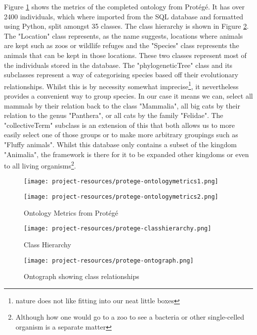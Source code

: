 \documentclass[a4paper]{article}
\begin{document}
Figure \ref{fig:ontologymetrics} shows the metrics of the completed ontology from Protégé. It has over 2400 individuals, which where imported from the SQL database and formatted using Python, split amongst 35 classes. 
The class hierarchy is shown in Figure \ref{fig:classhierarchy}. The "Location" class represents, as the name suggests, locations where animals are kept such as zoos or wildlife refuges and the "Species" class represents the animals that can be kept in those locations. These two classes represent most of the individuals stored in the database. The "phylogeneticTree" class and its subclasses represent a way of categorising species based off their evolutionary relationships\autocite{Rintoul2016}. Whilst this is by necessity somewhat imprecise\footnote{nature does not like fitting into our neat little boxes}, it nevertheless provides a convenient way to group species. In our case it means we can, select all mammals by their relation back to the class "Mammalia", all big cats by their relation to the genus "Panthera", or all cats by the family "Felidae". The "collectiveTerm" subclass is an extension of this that both allows us to more easily select one of those groups or to make more arbitrary groupings such as "Fluffy animals". Whilst this database only contains a subset of the kingdom "Animalia", the framework is there for it to be expanded other kingdoms or even to all living organisms\footnote{Although how one would go to a zoo to see a bacteria or other single-celled organism is a separate matter}.
\begin{figure}[h!]
\noindent\begin{minipage}{.45\textwidth}
\texttt{[image: project-resources/protege-ontologymetrics1.png]}
\end{minipage}\hfill
\begin{minipage}{.45\textwidth}
\texttt{[image: project-resources/protege-ontologymetrics2.png]}
\end{minipage}
\caption{Ontology Metrics from Protégé}
\label{fig:ontologymetrics}
\end{figure}

\begin{figure}[h!]
	\centering
	\texttt{[image: project-resources/protege-classhierarchy.png]}
	\caption{Class Hierarchy}
	\label{fig:classhierarchy}
\end{figure}

\begin{figure}[h!]
	\centering
	\texttt{[image: project-resources/protege-ontograph.png]}
	\caption{Ontograph showing class relationships}
	\label{fig:ontograph}
\end{figure}
\end{document}
